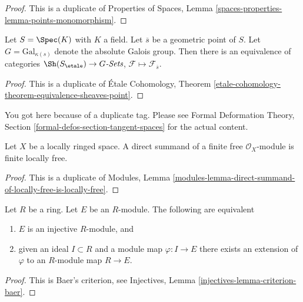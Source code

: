 \begin{proof}
This is a duplicate of
Properties of Spaces, Lemma \ref{spaces-properties-lemma-points-monomorphism}.
\end{proof}

\begin{theorem}
\label{theorem-equivalence-sheaves-point}
Let $S = \Spec(K)$ with $K$ a field.
Let $\overline{s}$ be a geometric point of $S$.
Let $G = \text{Gal}_{\kappa(s)}$ denote the absolute Galois group.
Then there is an equivalence of categories
$\Sh(S_\etale) \to G\textit{-Sets}$,
$\mathcal{F} \mapsto \mathcal{F}_{\overline{s}}$.
\end{theorem}

\begin{proof}
This is a duplicate of \'Etale Cohomology, Theorem
\ref{etale-cohomology-theorem-equivalence-sheaves-point}.
\end{proof}

\begin{remark}
\label{remark-tangent-spaces}
You got here because of a duplicate tag. Please see
Formal Deformation Theory, Section \ref{formal-defos-section-tangent-spaces}
for the actual content.
\end{remark}

\begin{lemma}
\label{lemma-locally-ringed-space-direct-summand-free}
Let $X$ be a locally ringed space. A direct summand of a finite free
$\mathcal{O}_X$-module is finite locally free.
\end{lemma}

\begin{proof}
This is a duplicate of Modules, Lemma
\ref{modules-lemma-direct-summand-of-locally-free-is-locally-free}.
\end{proof}

\begin{lemma}
\label{lemma-characterize-injective}
Let $R$ be a ring. Let $E$ be an $R$-module. The following are equivalent
\begin{enumerate}
\item $E$ is an injective $R$-module, and
\item given an ideal $I \subset R$ and a module map $\varphi : I \to E$
there exists an extension of $\varphi$ to an $R$-module map $R \to E$.
\end{enumerate}
\end{lemma}

\begin{proof}
This is Baer's criterion, see
Injectives, Lemma \ref{injectives-lemma-criterion-baer}.
\end{proof}

